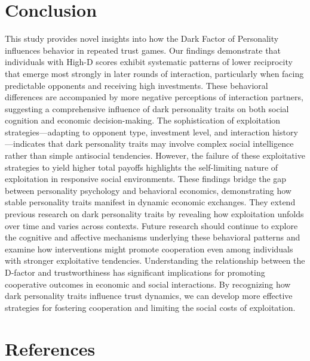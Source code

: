 \documentclass[
]{article}
\begin{document}
\section{Conclusion}\label{conclusion}

This study provides novel insights into how the Dark Factor of Personality influences behavior in repeated trust games.
Our findings demonstrate that individuals with High-D scores exhibit systematic patterns of lower reciprocity that emerge most strongly in later rounds of interaction, particularly when facing predictable opponents and receiving high investments.
These behavioral differences are accompanied by more negative perceptions of interaction partners, suggesting a comprehensive influence of dark personality traits on both social cognition and economic decision-making.
The sophistication of exploitation strategies---adapting to opponent type, investment level, and interaction history---indicates that dark personality traits may involve complex social intelligence rather than simple antisocial tendencies.
However, the failure of these exploitative strategies to yield higher total payoffs highlights the self-limiting nature of exploitation in responsive social environments.
These findings bridge the gap between personality psychology and behavioral economics, demonstrating how stable personality traits manifest in dynamic economic exchanges.
They extend previous research on dark personality traits by revealing how exploitation unfolds over time and varies across contexts.
Future research should continue to explore the cognitive and affective mechanisms underlying these behavioral patterns and examine how interventions might promote cooperation even among individuals with stronger exploitative tendencies.
Understanding the relationship between the D-factor and trustworthiness has significant implications for promoting cooperative outcomes in economic and social interactions.
By recognizing how dark personality traits influence trust dynamics, we can develop more effective strategies for fostering cooperation and limiting the social costs of exploitation.

\pagebreak

\section*{References}\label{references}
\end{document}
